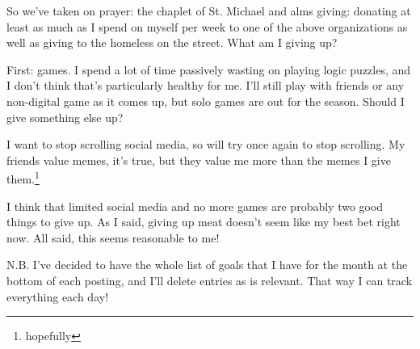 \documentclass[12pt]{article}[titlepage]
\renewcommand{\,}{\textsuperscript{,}}
\begin{document}
So we've taken on prayer: the chaplet of St. Michael and alms giving: donating at least as much as I spend on myself per week to one of the above organizations as well as giving to the homeless on the street.  
What am I giving up?

First: games. I spend a lot of time passively wasting on playing logic puzzles, and I don't think that's particularly healthy for me.  
I'll still play with friends or any non-digital game as it comes up, but solo games are out for the season.  
Should I give something else up?

I want to stop scrolling social media, so will try once again to stop scrolling.  
My friends value memes, it's true, but they value me more than the memes I give them.\footnote{hopefully}

I think that limited social media and no more games are probably two good things to give up.  
As I said, giving up meat doesn't seem like my best bet right now.  
All said, this seems reasonable to me!

  


N.B. I've decided to have the whole list of goals that I have for the month at the bottom of each posting, and I'll delete entries as is relevant. That way I can track everything each day!
\end{document}
